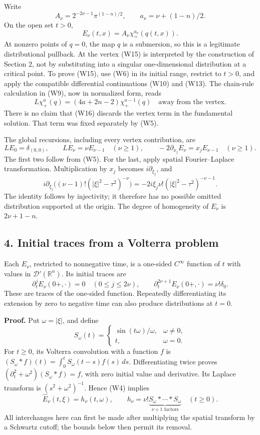 \documentclass[
  11pt,
]{article}
\begin{document}
Write \[
 A_\nu=2^{-2\nu-1}\pi^{(1-n)/2},\qquad
 a_\nu=\nu+(1-n)/2.
 \tag{W14}
\] On the open set \(t>0\), \[
                         E_\nu(t,x)=A_\nu\chi_+^{a_\nu}(q(t,x)).
 \tag{W15}
\] At nonzero points of \(q=0\), the map \(q\) is a submersion, so this
is a legitimate distributional pullback. At the vertex (W15) is
interpreted by the construction of Section 2, not by substituting into a
singular one-dimensional distribution at a critical point. To prove
(W15), use (W6) in its initial range, restrict to \(t>0\), and apply the
compatible differential continuations (W10) and (W13). The chain-rule
calculation in (W9), now in normalized form, reads \[
 L\chi_+^a(q)=(4a+2n-2)\chi_+^{a-1}(q)
 \quad\text{away from the vertex}.
 \tag{W16}
\] There is no claim that (W16) discards the vertex term in the
fundamental solution. That term was fixed separately by (W5).

The global recursions, including every vertex contribution, are \[
 LE_0=\delta_{(0,0)},\qquad LE_\nu=\nu E_{\nu-1}\quad(\nu\geq1),
 \qquad -2\partial_{x_j}E_\nu=x_jE_{\nu-1}\quad(\nu\geq1).
 \tag{W17}
\] The first two follow from (W5). For the last, apply spatial
Fourier--Laplace transformation. Multiplication by \(x_j\) becomes
\(i\partial_{\xi_j}\), and \[
 i\partial_{\xi_j}\bigl((\nu-1)!(|\xi|^2-\tau^2)^{-\nu}\bigr)
       =-2i\xi_j\nu!(|\xi|^2-\tau^2)^{-\nu-1}.
 \tag{W18}
\] The identity follows by injectivity; it therefore has no possible
omitted distribution supported at the origin. The degree of homogeneity
of \(E_\nu\) is \(2\nu+1-n\).

\subsection{4. Initial traces from a Volterra
problem}\label{initial-traces-from-a-volterra-problem}

Each \(E_\nu\), restricted to nonnegative time, is a one-sided
\(C^\infty\) function of \(t\) with values in
\(\mathcal D'(\mathbb R^n)\). Its initial traces are \[
 \partial_t^jE_\nu(0+,\cdot)=0\quad(0\leq j\leq2\nu),\qquad
 \partial_t^{2\nu+1}E_\nu(0+,\cdot)=\nu!\delta_0.
 \tag{W19}
\] These are traces of the one-sided function. Repeatedly
differentiating its extension by zero to negative time can also produce
distributions at \(t=0\).

\textbf{Proof.} Put \(\omega=|\xi|\), and define \[
 S_\omega(t)=\begin{cases}\sin(t\omega)/\omega,&\omega\ne0,\\t,&\omega=0.\end{cases}
 \tag{W20}
\] For \(t\geq0\), its Volterra convolution with a function \(f\) is
\((S_\omega*f)(t)=\int_0^tS_\omega(t-s)f(s)\,ds\). Differentiating twice
proves \((\partial_t^2+\omega^2)(S_\omega*f)=f\), with zero initial
value and derivative. Its Laplace transform is \((s^2+\omega^2)^{-1}\).
Hence (W4) implies \[
 \widehat E_\nu(t,\xi)=h_\nu(t,\omega),\qquad
 h_\nu=\nu!\underbrace{S_\omega*\cdots*S_\omega}_{\nu+1\text{ factors}}
 \quad(t\geq0).
 \tag{W21}
\] All interchanges here can first be made after multiplying the spatial
transform by a Schwartz cutoff; the bounds below then permit its
removal.
\end{document}
